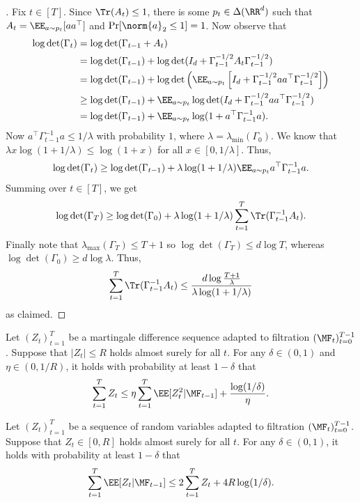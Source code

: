 \begin{proof}[]
Fix $t \in [T]$. Since $\Tr(A_t) \leq 1$, there is some $p_t \in \Delta(\RR^d)$ such that $A_t = \EE_{a \sim p_t}\brk{ aa^\top}$ and $\Pr[\norm{a}_2\leq 1] = 1$. Now observe that
\begin{align}
\log \det(\Gamma_t)
&= \log \det(\Gamma_{t-1} + A_t) \\ 
&= \log \det(\Gamma_{t-1}) + \log \det(I_d + \Gamma_{t-1}^{-1/2} A_t \Gamma_{t-1}^{-1/2}) \\ 
&= \log \det(\Gamma_{t-1}) + \log \det\left(\EE_{a \sim p_t}\left[I_d + \Gamma_{t-1}^{-1/2} aa^\top \Gamma_{t-1}^{-1/2}\right]\right) \\ 
&\geq \log \det(\Gamma_{t-1}) + \EE_{a \sim p_t} \log \det(I_d + \Gamma_{t-1}^{-1/2}aa^\top \Gamma_{t-1}^{-1/2}) \\ 
&= \log\det(\Gamma_{t-1}) + \EE_{a\sim p_t}\log(1 + a^\top \Gamma_{t-1}^{-1} a).
\end{align}
Now $a^\top \Gamma_{t-1}^{-1} a \leq 1/\lambda$ with probability $1$, where $\lambda = \lambda_{\min}(\Gamma_0)$. We know that $\lambda x\log(1+1/\lambda) \leq \log(1+x)$ for all $x \in [0,1/\lambda]$. Thus,
\[\log\det(\Gamma_t) \geq \log\det(\Gamma_{t-1}) + \lambda \log(1+1/\lambda) \EE_{a\sim p_t} a^\top \Gamma_{t-1}^{-1} a.\]
Summing over $t\in [T]$, we get
\[\log \det(\Gamma_T) \geq \log \det(\Gamma_0) + \lambda\log(1+1/\lambda) \sum_{t=1}^T \Tr(\Gamma_{t-1}^{-1} A_t).\]
Finally note that $\lambda_{\max}(\Gamma_T) \leq T+1$ so $\log \det(\Gamma_T) \leq d\log T$, whereas $\log\det(\Gamma_0) \geq d\log \lambda$. Thus,
\[\sum_{t=1}^T \Tr(\Gamma_{t-1}^{-1} A_t) \leq \frac{d\log \frac{T+1}{\lambda}}{\lambda\log(1+1/\lambda)}\]
as claimed.
\end{proof}

\begin{lemma}\label{lemma:freedman}
Let $(Z_t)_{t=1}^T$ be a martingale difference sequence adapted to filtration $(\MF_t)_{t=0}^{T-1}$. Suppose that $|Z_t| \leq R$ holds almost surely for all $t$. For any $\delta \in (0,1)$ and $\eta \in (0, 1/R)$, it holds with probability at least $1-\delta$ that
\[\sum_{t=1}^T Z_t \leq \eta \sum_{t=1}^T \EE[Z_t^2|\MF_{t-1}] + \frac{\log(1/\delta)}{\eta}.\]
\end{lemma}

\begin{corollary}\label{cor:filtration-tail}
Let $(Z_t)_{t=1}^T$ be a sequence of random variables adapted to filtration $(\MF_t)_{t=0}^{T-1}$. Suppose that $Z_t \in [0,R]$ holds almost surely for all $t$. For any $\delta \in (0,1)$, it holds with probability at least $1-\delta$ that 
\[\sum_{t=1}^T \EE[Z_t|\MF_{t-1}] \leq 2\sum_{t=1}^T Z_t + 4R\log(1/\delta).\]
\end{corollary}

